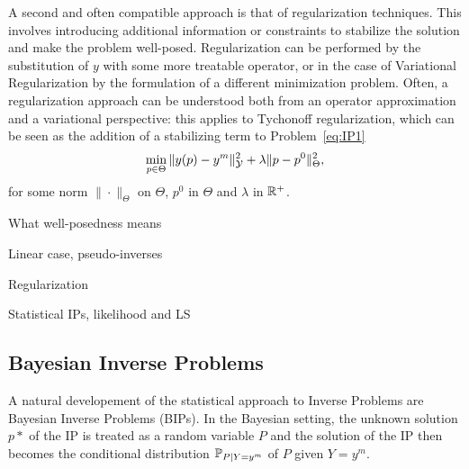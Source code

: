 A second and often compatible approach is that of regularization techniques. This involves introducing additional information or constraints to stabilize the solution and make the problem well-posed. Regularization can be performed by the substitution of $y$ with some more treatable operator, or in the case of Variational Regularization by the formulation of a different minimization problem. Often, a regularization approach can be understood both from an operator approximation and a variational perspective: this applies to Tychonoff regularization, which can be seen as the addition of a stabilizing term to Problem~\ref{eq:IP1}
\begin{equation}\label{eq:Tycho}
    \min_{p\in \Theta} \| y(p) - y^m \|_\mathcal Y^2 + \lambda\| p - p^0 \|_\Theta^2,
\end{equation}
for some norm $\|\cdot\|_\Theta$ on $\Theta$, $p^0$ in $\Theta$ and $\lambda $ in $ \mathbb{R}^+$.

What well-posedness means

Linear case, pseudo-inverses

Regularization

Statistical IPs, likelihood and LS 


\subsection{Bayesian Inverse Problems}\label{sec:BIP}

A natural developement of the statistical approach to Inverse Problems are Bayesian Inverse Problems (BIPs). 
In the Bayesian setting, the unknown solution $p*$ of the IP is treated as a random variable $P$ and the solution of the IP then becomes the conditional distribution $\mathbb P_{P \mid Y=y^m} $ of $P$ given $Y=y^m$.

